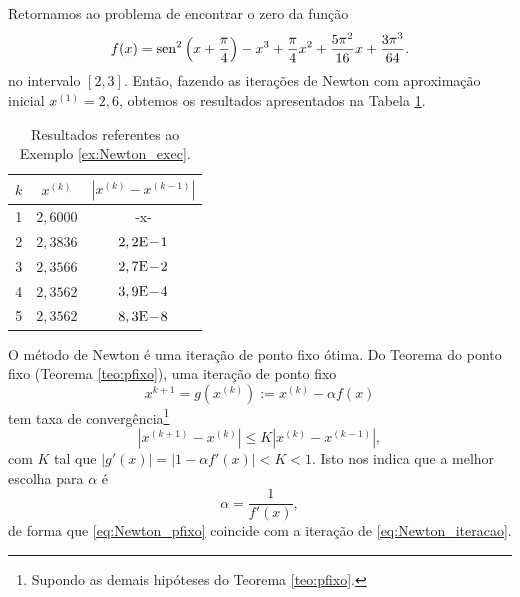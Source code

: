 \begin{ex}\label{ex:Newton_exec}
  Retornamos ao problema de encontrar o zero da função
  \begin{equation}
    f(x) = \operatorname{sen}^2\left(x+\frac{\pi}{4}\right) - x^3 + \frac{\pi}{4}x^2 + \frac{5\pi^2}{16}x + \frac{3\pi^3}{64}.
  \end{equation}
  no intervalo $[2,3]$. Então, fazendo as iterações de Newton com aproximação inicial $x^{(1)}=2,6$, obtemos os resultados apresentados na Tabela \ref{tab:ex_Newton_exec}.

\begin{table}[h!]
  \centering
  \caption{Resultados referentes ao Exemplo \ref{ex:Newton_exec}.}
  \label{tab:ex_Newton_exec}
  \begin{tabular}{r|cc}
    $k$ & $x^{(k)}$ & $|x^{(k)}-x^{(k-1)}|$ \\\hline
    1 & $2,6000$ & -x-\\
    2 & $2,3836$ & $2,2\mathrm{E}\!-\!1$ \\
    3 & $2,3566$ & $2,7\mathrm{E}\!-\!2$ \\
    4 & $2,3562$ & $3,9\mathrm{E}\!-\!4$ \\
    5 & $2,3562$ & $8,3\mathrm{E}\!-\!8$ \\\hline
  \end{tabular}
\end{table}

% 
\end{ex}

\begin{obs}
  O método de Newton é uma iteração de ponto fixo ótima. Do Teorema do ponto fixo (Teorema \ref{teo:pfixo}), uma iteração de ponto fixo
  \begin{equation}\label{eq:Newton_pfixo}
    x^{k+1} = g(x^{(k)}) := x^{(k)} -\alpha f(x)
  \end{equation}
tem taxa de convergência\footnote{Supondo as demais hipóteses do Teorema \ref{teo:pfixo}.}
\begin{equation}
  |x^{(k+1)}-x^{(k)}| \leq K |x^{(k)}-x^{(k-1)}|,
\end{equation}
com $K$ tal que $|g'(x)|=|1 - \alpha f'(x)|<K<1$. Isto nos indica que a melhor escolha para $\alpha$ é
\begin{equation}
  \alpha = \frac{1}{f'(x)},
\end{equation}
de forma que \eqref{eq:Newton_pfixo} coincide com a iteração de \eqref{eq:Newton_iteracao}.
\end{obs}


